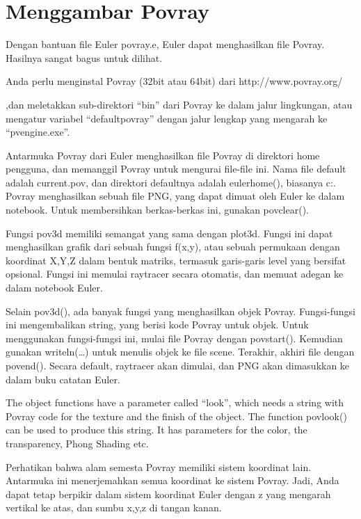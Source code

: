 \documentclass[
]{book}
\begin{document}
\chapter{Menggambar Povray}\label{menggambar-povray}

Dengan bantuan file Euler povray.e, Euler dapat menghasilkan file Povray. Hasilnya sangat bagus untuk dilihat.

Anda perlu menginstal Povray (32bit atau 64bit) dari http://www.povray.org/

,dan meletakkan sub-direktori ``bin'' dari Povray ke dalam jalur lingkungan, atau mengatur variabel ``defaultpovray'' dengan jalur lengkap yang mengarah ke ``pvengine.exe''.

Antarmuka Povray dari Euler menghasilkan file Povray di direktori home pengguna, dan memanggil Povray untuk mengurai file-file ini. Nama file default adalah current.pov, dan direktori defaultnya adalah eulerhome(), biasanya c:\Users\Username\Euler. Povray menghasilkan sebuah file PNG, yang dapat dimuat oleh Euler ke dalam notebook. Untuk membersihkan berkas-berkas ini, gunakan povclear().

Fungsi pov3d memiliki semangat yang sama dengan plot3d. Fungsi ini dapat menghasilkan grafik dari sebuah fungsi f(x,y), atau sebuah permukaan dengan koordinat X,Y,Z dalam bentuk matriks, termasuk garis-garis level yang bersifat opsional. Fungsi ini memulai raytracer secara otomatis, dan memuat adegan ke dalam notebook Euler.

Selain pov3d(), ada banyak fungsi yang menghasilkan objek Povray. Fungsi-fungsi ini mengembalikan string, yang berisi kode Povray untuk objek. Untuk menggunakan fungsi-fungsi ini, mulai file Povray dengan povstart(). Kemudian gunakan writeln(\ldots) untuk menulis objek ke file scene. Terakhir, akhiri file dengan povend(). Secara default, raytracer akan dimulai, dan PNG akan dimasukkan ke dalam buku catatan Euler.

The object functions have a parameter called ``look'', which needs a string with Povray code for the texture and the finish of the object. The function povlook() can be used to produce this string. It has parameters for the color, the transparency, Phong Shading etc.

Perhatikan bahwa alam semesta Povray memiliki sistem koordinat lain. Antarmuka ini menerjemahkan semua koordinat ke sistem Povray. Jadi, Anda dapat tetap berpikir dalam sistem koordinat Euler dengan z yang mengarah vertikal ke atas, dan sumbu x,y,z di tangan kanan.
\end{document}

